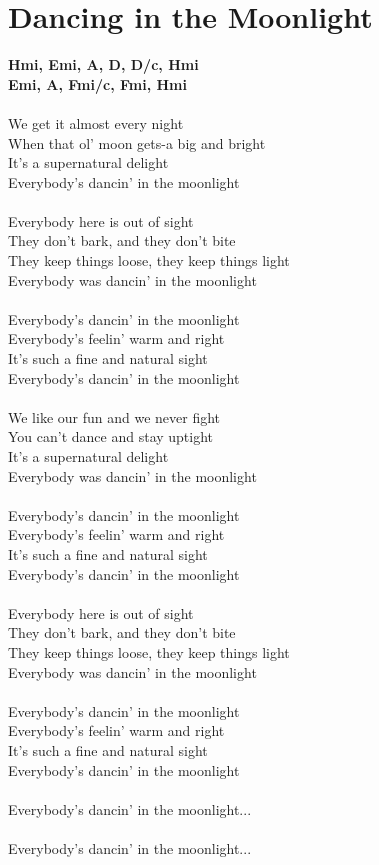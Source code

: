 \section{Dancing in the Moonlight}
\footnotesize\textbf{Hmi, Emi, A, D, D/c\kr , Hmi \\ Emi, A, F\kr mi/c\kr , F\kr mi, Hmi}\\
\\
\normalsize
We get it almost every night\\
When that ol' moon gets-a big and bright\\
It's a supernatural delight\\
Everybody's dancin' in the moonlight\\
\\
Everybody here is out of sight\\
They don't bark, and they don't bite\\
They keep things loose, they keep things light\\
Everybody was dancin' in the moonlight\\
\\
Everybody's dancin' in the moonlight\\
Everybody's feelin' warm and right\\
It's such a fine and natural sight\\
Everybody's dancin' in the moonlight\\
\\
We like our fun and we never fight\\
You can't dance and stay uptight\\
It's a supernatural delight\\
Everybody was dancin' in the moonlight\\
\\
Everybody's dancin' in the moonlight\\
Everybody's feelin' warm and right\\
It's such a fine and natural sight\\
Everybody's dancin' in the moonlight\\
\\
Everybody here is out of sight\\
They don't bark, and they don't bite\\
They keep things loose, they keep things light\\
Everybody was dancin' in the moonlight\\
\\
Everybody's dancin' in the moonlight\\
Everybody's feelin' warm and right\\
It's such a fine and natural sight\\
Everybody's dancin' in the moonlight\\
\\
Everybody's dancin' in the moonlight...\\
\\
Everybody's dancin' in the moonlight...\\